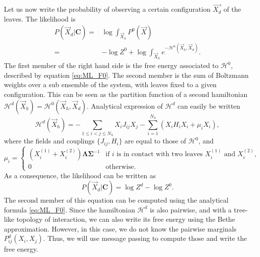 \documentclass[10pt]{article}
\newcommand{\Lam}{\bm{\Lambda}}
\newcommand{\Sig}{\bm{\Sigma}}
\begin{document}
Let us now write the probability of observing a certain configuration $\vec{X_d}$ of the leaves. The likelihood is 
\begin{equation}
  \label{eq:ML_likelihood}
  \begin{split}
  P(\vec{X}_d | \bm{C}) =& \log \int_{\vec{X}_h} P^0(\vec{X})\\
               =& -\log Z^0 + \log\int_{\vec{X}_h} e^{-\mathcal{H}^0(\vec{X}_h,\vec{X}_d)}.
  \end{split}
\end{equation}
The first member of the right hand side is the free energy associated to $\mathcal{H}^0$, described by equation \ref{eq:ML_F0}. The second member is the sum of Boltzmann weights over a sub ensemble of the system, with leaves fixed to a given configuration. This can be seen as the partition function of a second hamiltonian $\mathcal{H}^d(\vec{X}_h) = \mathcal{H}^0(\vec{X}_h,\vec{X}_d)$. Analytical expression of $\mathcal{H}^d$ can easily be written
\begin{equation}
  \label{eq:ML_Hd}
  \mathcal{H}^d(\vec{X}_h) = -\sum_{1\leq i<j\leq N_h}X_iJ_{ij}X_j - \sum_{i=1}^{N_h} \left(X_iH_iX_i + \mu_i X_i\right),
\end{equation}
where the fields and couplings $\{J_{ij},H_i\}$ are equal to those of $\mathcal{H}^0$, and 
\begin{equation*}
  \label{eq:ML_mudef}
  \mu_i =
  \begin{cases}
  (X_i^{(1)} + X_i^{(2)})\Lam\Sig^{-1} & \text{if $i$ is in contact with two leaves $X_i^{(1)}$ and $X_i^{(2)}$} ,\\
  0 & \text{otherwise}.
  \end{cases}
\end{equation*}
As a consequence, the likelihood can be written as 
\begin{equation}
  \label{eq:ML_likelihood2}
  P(\vec{X}_d | \bm{C}) = \log Z^d -\log Z^0.
\end{equation}
The second member of this equation can be computed using the analytical formula \ref{eq:ML_F0}. Since the hamiltonian $\mathcal{H}^d$ is also pairwise, and with a tree-like topology of interaction, we can also write its free energy using the Bethe approximation. However, in this case, we do not know the pairwise marginals $P_{ij}^d(X_i,X_j)$. Thus, we will use message passing to compute those and write the free energy. \\

\end{document}
